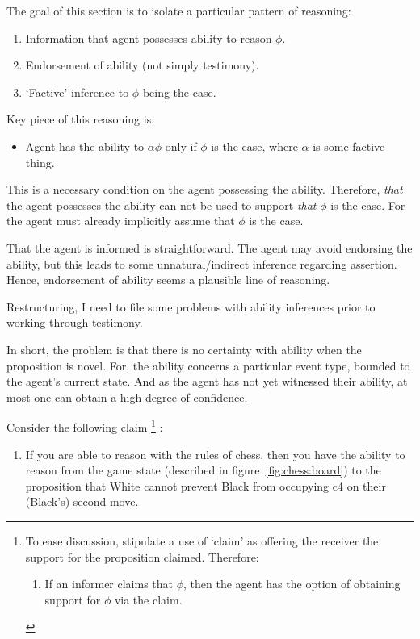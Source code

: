 \documentclass[10pt]{article}
\begin{document}
\begin{note}
  The goal of this section is to isolate a particular pattern of reasoning:
  \begin{enumerate}
  \item Information that agent possesses ability to reason \(\phi\).
  \item Endorsement of ability (not simply testimony).
  \item `Factive' inference to \(\phi\) being the case.
  \end{enumerate}
  Key piece of this reasoning is:
  \begin{itemize}
  \item Agent has the ability to \(\alpha\phi\) only if \(\phi\) is the case, where \(\alpha\) is some factive thing.
  \end{itemize}
  This is a necessary condition on the agent possessing the ability.
  Therefore, \emph{that} the agent possesses the ability can not be used to support \emph{that} \(\phi\) is the case.
  For the agent must already implicitly assume that \(\phi\) is the case.

  That the agent is informed is straightforward.
  The agent may avoid endorsing the ability, but this leads to some unnatural/indirect inference regarding assertion.
  Hence, endorsement of ability seems a plausible line of reasoning.

  Restructuring, I need to file some problems with ability inferences prior to working through testimony.

  In short, the problem is that there is no certainty with ability when the proposition is novel.
  For, the ability concerns a particular event type, bounded to the agent's current state.
  And as the agent has not yet witnessed their ability, at most one can obtain a high degree of confidence.
\end{note}

Consider the following claim\nolinebreak
\footnote{
  To ease discussion, stipulate a use of `claim' as offering the receiver the support for the proposition claimed.
  Therefore:
  \begin{enumerate}
  \item\label{cond:claim-to-opt-supp} If an informer claims that \(\phi\), then the agent has the option of obtaining support for \(\phi\) via the claim.
  \end{enumerate}
}\nolinebreak
:
\begin{enumerate}
\item\label{chess:claim:1}\label{chess:claim:1:conditional} If you are able to reason with the rules of chess, then you have the ability to reason from the game state (described in figure~\ref{fig:chess:board}) to the proposition that White cannot prevent Black from occupying c4 on their (Black's) second move.
\end{enumerate}
\end{document}
